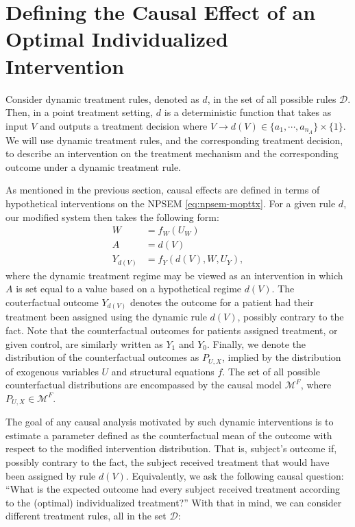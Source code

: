 \documentclass[
  12pt, krantz2,
]{krantz}
\theoremstyle{definition}
\theoremstyle{definition}
\theoremstyle{definition}
\newcommand{\1}{\mathbbm{1}}
\begin{document}
\hypertarget{defining-the-causal-effect-of-an-optimal-individualized-intervention}{%
\section{Defining the Causal Effect of an Optimal Individualized Intervention}\label{defining-the-causal-effect-of-an-optimal-individualized-intervention}}

Consider dynamic treatment rules, denoted as \(d\), in the set of all possible rules
\(\mathcal{D}\). Then, in a point treatment setting, \(d\) is a deterministic function
that takes as input \(V\) and outputs a treatment decision where
\(V \rightarrow d(V) \in \{a_1, \cdots, a_{n_A} \} \times \{1\}\).
We will use dynamic treatment rules, and the corresponding treatment
decision, to describe an intervention on the treatment mechanism and the
corresponding outcome under a dynamic treatment rule.

As mentioned in the previous section, causal effects are defined in terms of
hypothetical interventions on the NPSEM \eqref{eq:npsem-mopttx}. For a given
rule \(d\), our modified system then takes the following form:
\begin{align}
  W &= f_W(U_W) \\ A &= d(V) \\ Y_{d(V)} &= f_Y(d(V), W, U_Y),
  \label{eq:npsem-causal-mopttx}
\end{align}
where the dynamic treatment regime may be viewed as an intervention in which \(A\)
is set equal to a value based on a hypothetical regime \(d(V)\). The couterfactual outcome
\(Y_{d(V)}\) denotes the outcome for a patient had their treatment been assigned using the
dynamic rule \(d(V)\), possibly contrary to the fact. Note that the counterfactual
outcomes for patients assigned treatment, or given control, are similarly written as
\(Y_1\) and \(Y_0\). Finally, we denote the distribution of the counterfactual outcomes
as \(P_{U,X}\), implied by the distribution of exogenous variables \(U\) and structural
equations \(f\). The set of all possible counterfactual distributions are encompassed
by the causal model \(\mathcal{M}^F\), where \(P_{U,X} \in \mathcal{M}^F\).

The goal of any causal analysis motivated by such dynamic interventions is to
estimate a parameter defined as the counterfactual mean of the outcome with
respect to the modified intervention distribution. That is, subject's outcome if,
possibly contrary to the fact, the subject received treatment that would have been
assigned by rule \(d(V)\). Equivalently, we ask the following causal question:
``What is the expected outcome had every subject received treatment according to the
(optimal) individualized treatment?'' With that in mind, we can consider different
treatment rules, all in the set \(\mathcal{D}\):
\end{document}
